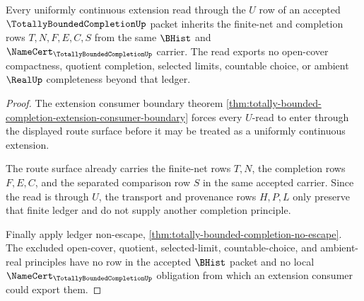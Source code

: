 \begin{theorem}
\label{thm:totally-bounded-completion-root-extension-ledger}
Every uniformly continuous extension read through the $U$ row of an accepted $\TotallyBoundedCompletionUp$ packet inherits the finite-net and completion rows $T,N,F,E,C,S$ from the same $\BHist$ and $\NameCert_{\TotallyBoundedCompletionUp}$ carrier. The read exports no open-cover compactness, quotient completion, selected limits, countable choice, or ambient $\RealUp$ completeness beyond that ledger.
\end{theorem}
\begin{proof}
The extension consumer boundary theorem \autoref{thm:totally-bounded-completion-extension-consumer-boundary} forces every $U$-read to enter through the displayed route surface before it may be treated as a uniformly continuous extension.

The route surface already carries the finite-net rows $T,N$, the completion rows $F,E,C$, and the separated comparison row $S$ in the same accepted carrier. Since the read is through $U$, the transport and provenance rows $H,P,L$ only preserve that finite ledger and do not supply another completion principle.

Finally apply ledger non-escape, \autoref{thm:totally-bounded-completion-no-escape}. The excluded open-cover, quotient, selected-limit, countable-choice, and ambient-real principles have no row in the accepted $\BHist$ packet and no local $\NameCert_{\TotallyBoundedCompletionUp}$ obligation from which an extension consumer could export them.
\end{proof}

